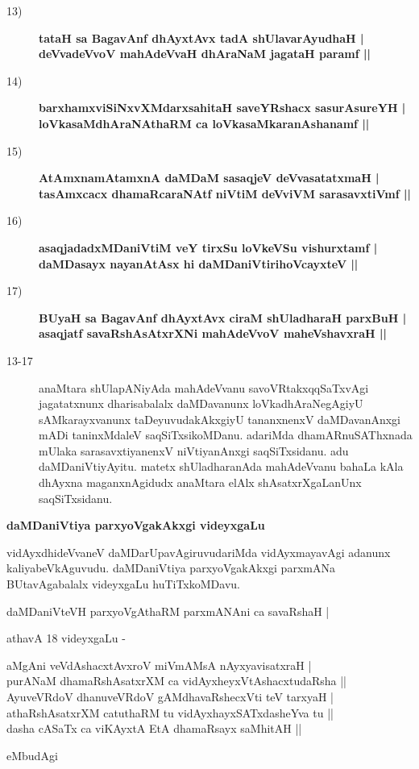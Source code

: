 \begin{description}
\item [13)] {\bf tataH sa BagavAnf dhAyxtAvx tadA shUlavarAyudhaH |\\ deVvadeVvoV mahAdeVvaH dhAraNaM jagataH paramf ||}
\item [14)] {\bf barxhamxviSiNxvXMdarxsahitaH saveYRshacx sasurAsureYH |\\ loVkasaMdhAraNAthaRM ca loVkasaMkaranAshanamf ||}
\item [15)] {\bf AtAmxnamAtamxnA daMDaM sasaqjeV deVvasatatxmaH |\\ tasAmxcacx dhamaRcaraNAtf niVtiM deVviVM sarasavxtiVmf ||}
\item [16)] {\bf asaqjadadxMDaniVtiM veY tirxSu loVkeVSu vishurxtamf |\\ daMDasayx nayanAtAsx hi daMDaniVtirihoVcayxteV ||}
\item [17)] {\bf BUyaH sa BagavAnf dhAyxtAvx ciraM shUladharaH parxBuH |\\ asaqjatf savaRshAsAtxrXNi mahAdeVvoV maheVshavxraH ||}

\item [13-17] anaMtara shUlapANiyAda mahAdeVvanu savoVRtakxqqSaTxvAgi jagatatxnunx dharisabalalx daMDavanunx loV\-ka\-dhAraNegAgiyU sAMkarayxvanunx taDeyuvu\-dakAkxgiyU tananxnenxV daMDavanAnxgi mADi taninxMda\-leV saqSiTxsikoMDanu. adariMda dhamARnuSAThxnada mUlaka sarasavxtiyanenxV niVtiyanAnxgi saqSiTxsi\-danu. adu daMDaniVtiyAyitu. matetx shUladharanAda mahAdeVvanu bahaLa kAla dhAyxna maganx\-nAgidudx anaMtara elAlx shAsatxrXgaLanUnx saqSiTxsidanu.
\end{description}

{\noindent
{\large\bf daMDaniVtiya parxyoVgakAkxgi videyxgaLu}}\label{page99}
\medskip

\noindent
vidAyxdhideVvaneV daMDarUpavAgiruvudariMda vidAyxmayavAgi adanunx kaliya\-beVkAguvudu. daM\-Da\-niVtiya parxyoVgakAkxgi parxmANa BUtavAgabalalx videyxgaLu huTiTxkoMDavu.

\begin{shloka}
daMDaniVteVH parxyoVgAthaRM parxmANAni ca savaRshaH |\label{99}
\end{shloka}

 athavA 18 videyxgaLu -

\begin{shloka}
aMgAni veVdAshacxtAvxroV miVmAMsA nAyxyavisatxraH |\\
purANaM dhamaRshAsatxrXM ca vidAyxheyxVtAshacxtudaRsha ||\\
AyuveVRdoV dhanuveVRdoV gAMdhavaRshecxVti teV tarxyaH |\\
athaRshAsatxrXM catuthaRM tu vidAyxhayxSATxdasheYva tu ||\\
dasha cASaTx ca viKAyxtA EtA dhamaRsayx saMhitAH ||
\end{shloka}
 eMbudAgi
 
